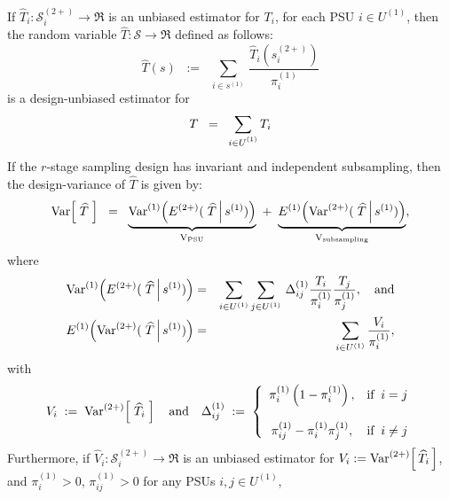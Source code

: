 \begin{theorem}
\mbox{}\vskip 0.1cm
\noindent
If $\widehat{T}_{i} : \mathcal{S}^{(2+)}_{i} \longrightarrow \Re$ is an unbiased estimator for $T_{i}$,
for each \textnormal{PSU} $i \in U^{(1)}$,
then the random variable $\widehat{T} : \mathcal{S} \longrightarrow \Re$ defined as follows:
\begin{equation}
\widehat{T}(s)
\;\;:=\;\;
\sum_{i\in s^{(1)}}\,\frac{\widehat{T}_{i}(s^{(2+)}_{i})}{\pi^{(1)}_{i}}
\end{equation}
is a design-unbiased estimator for
\begin{equation*}
T \;\; = \;\; \sum_{i\in U^{(1)}_{\color{white} i}}T_{i}
\end{equation*}
If the $r$-stage sampling design has invariant and independent subsampling,
then the design-variance of $\widehat{T}$ is given by:
\begin{equation}
\textnormal{Var}\!\left[\;\widehat{T}\;\right]
\;\;=\;\;
\underset{\textnormal{V}_{\textnormal{PSU}}}{\underbrace{\textnormal{Var}^{(1)}\!\left(E^{(2+)}(\,\left.\widehat{T}\,\right\vert s^{(1)})\right)}}
\;+\;
\underset{\textnormal{V}_{\textnormal{subsampling}}}{\underbrace{E^{(1)}\!\left(\textnormal{Var}^{(2+)}(\,\left.\widehat{T}\,\right\vert s^{(1)})\right)}},
\end{equation}
where
\begin{eqnarray*}
\textnormal{Var}^{(1)}\!\left(E^{(2+)}(\,\left.\widehat{T}\,\right\vert s^{(1)})\right)
&=&
\sum_{i\in U^{(1)}}\sum_{j\in U^{(1)}}\,\Delta^{(1)}_{ij}\frac{T_{i}}{\pi^{(1)}_{i}}\frac{T_{j}}{\pi^{(1)}_{j}},\quad\textnormal{and}
\\
E^{(1)}\!\left(\textnormal{Var}^{(2+)}(\,\left.\widehat{T}\,\right\vert s^{(1)})\right)
&=&
\sum_{i\in U^{(1)}}\frac{V_{i}}{\pi^{(1)}_{i}},
\end{eqnarray*}
with
\begin{equation}
V_{i} \;:=\; \textnormal{Var}^{(2+)}\!\left[\;\widehat{T}_{i}\;\right]
\quad\textnormal{and}\quad
\Delta^{(1)}_{ij}\;:=\;
\left\{
\begin{array}{cl}
\pi^{(1)}_{i}\left(1 - \pi^{(1)}_{i}\right), & \textnormal{if}\;\; i = j
\\ \\
\pi^{(1)}_{ij} - \pi^{(1)}_{i}\pi^{(1)}_{j}, & \textnormal{if}\;\; i \neq j
\end{array}
\right.
\end{equation}
Furthermore, if $\widehat{V}_{i} : \mathcal{S}^{(2+)}_{i} \longrightarrow \Re$
is an unbiased estimator for
$V_{i} := \textnormal{Var}^{(2+)}\!\left[\,\widehat{T}_{i}\,\right]$, and
$\pi^{(1)}_{i} > 0$, $\pi^{(1)}_{ij} > 0$ for any \textnormal{PSU}s $i,j \in U^{(1)}$,

\end{theorem}
